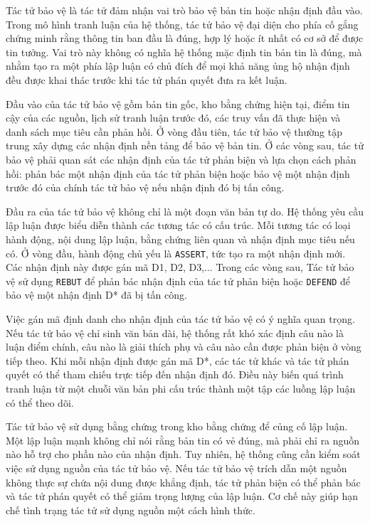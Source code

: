 ﻿\documentclass[oneside,a4paper,12pt]{extreport}
\begin{document}
Tác tử bảo vệ là tác tử đảm nhận vai trò bảo vệ bản tin hoặc nhận định đầu vào. Trong mô hình tranh luận của hệ thống, tác tử bảo vệ đại diện cho phía cố gắng chứng minh rằng thông tin ban đầu là đúng, hợp lý hoặc ít nhất có cơ sở để được tin tưởng. Vai trò này không có nghĩa hệ thống mặc định tin bản tin là đúng, mà nhằm tạo ra một phía lập luận có chủ đích để mọi khả năng ủng hộ nhận định đều được khai thác trước khi tác tử phán quyết đưa ra kết luận.

Đầu vào của tác tử bảo vệ gồm bản tin gốc, kho bằng chứng hiện tại, điểm tin cậy của các nguồn, lịch sử tranh luận trước đó, các truy vấn đã thực hiện và danh sách mục tiêu cần phản hồi. Ở vòng đầu tiên, tác tử bảo vệ thường tập trung xây dựng các nhận định nền tảng để bảo vệ bản tin. Ở các vòng sau, tác tử bảo vệ phải quan sát các nhận định của tác tử phản biện và lựa chọn cách phản hồi: phản bác một nhận định của tác tử phản biện hoặc bảo vệ một nhận định trước đó của chính tác tử bảo vệ nếu nhận định đó bị tấn công.

Đầu ra của tác tử bảo vệ không chỉ là một đoạn văn bản tự do. Hệ thống yêu cầu lập luận được biểu diễn thành các tương tác có cấu trúc. Mỗi tương tác có loại hành động, nội dung lập luận, bằng chứng liên quan và nhận định mục tiêu nếu có. Ở vòng đầu, hành động chủ yếu là \texttt{ASSERT}, tức tạo ra một nhận định mới. Các nhận định này được gán mã D1, D2, D3,... Trong các vòng sau, Tác tử bảo vệ sử dụng \texttt{REBUT} để phản bác nhận định của tác tử phản biện hoặc \texttt{DEFEND} để bảo vệ một nhận định D* đã bị tấn công.

Việc gán mã định danh cho nhận định của tác tử bảo vệ có ý nghĩa quan trọng. Nếu tác tử bảo vệ chỉ sinh văn bản dài, hệ thống rất khó xác định câu nào là luận điểm chính, câu nào là giải thích phụ và câu nào cần được phản biện ở vòng tiếp theo. Khi mỗi nhận định được gán mã D*, các tác tử khác và tác tử phán quyết có thể tham chiếu trực tiếp đến nhận định đó. Điều này biến quá trình tranh luận từ một chuỗi văn bản phi cấu trúc thành một tập các luồng lập luận có thể theo dõi.

Tác tử bảo vệ sử dụng bằng chứng trong kho bằng chứng để củng cố lập luận. Một lập luận mạnh không chỉ nói rằng bản tin có vẻ đúng, mà phải chỉ ra nguồn nào hỗ trợ cho phần nào của nhận định. Tuy nhiên, hệ thống cũng cần kiểm soát việc sử dụng nguồn của tác tử bảo vệ. Nếu tác tử bảo vệ trích dẫn một nguồn không thực sự chứa nội dung được khẳng định, tác tử phản biện có thể phản bác và tác tử phán quyết có thể giảm trọng lượng của lập luận. Cơ chế này giúp hạn chế tình trạng tác tử sử dụng nguồn một cách hình thức.
\end{document}
